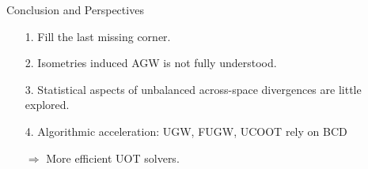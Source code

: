 \documentclass{beamer}
\begin{document}
\begin{frame}{Conclusion and Perspectives}

\vspace{0.8cm}
{}
\vspace{0.1cm}
\begin{enumerate}
  \setlength\itemsep{0.1cm}
  \item[1.] Fill the last missing corner.
  \item[2.] Isometries induced AGW is not fully understood.
  \item[3.] Statistical aspects of unbalanced across-space divergences
  are little explored.
  \item[4.] Algorithmic acceleration: UGW, FUGW, UCOOT rely on BCD

  $\Rightarrow$ More efficient UOT solvers.


\end{enumerate}
\end{frame}
\end{document}

